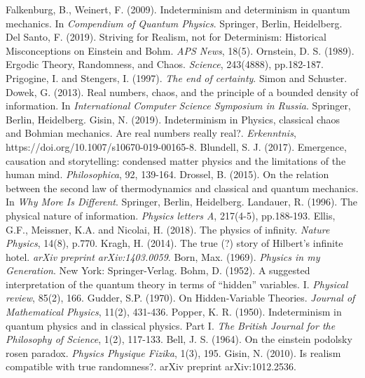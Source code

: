 \documentclass[12pt]{article}
\begin{document}
\begin{small}
\begin{thebibliography}{200}
 Falkenburg, B., Weinert, F. (2009). Indeterminism and determinism in quantum mechanics. In \emph{Compendium of Quantum Physics}. Springer, Berlin, Heidelberg.
 Del Santo, F. (2019). Striving for Realism, not for Determinism: Historical Misconceptions on Einstein and Bohm. \emph{APS News}, 18(5).
 Ornstein, D. S. (1989). Ergodic Theory, Randomness, and Chaos. \emph{Science}, 243(4888), pp.182-187.
 Prigogine, I. and Stengers, I. (1997). \emph{The end of certainty}. Simon and Schuster.
 Dowek, G. (2013). Real numbers, chaos, and the principle of a bounded density of information. In \emph{International Computer Science Symposium in Russia}. Springer, Berlin, Heidelberg.
 Gisin, N. (2019). Indeterminism in Physics, classical chaos and Bohmian mechanics. Are real numbers really real?. \emph{Erkenntnis}, https://doi.org/10.1007/s10670-019-00165-8.
 Blundell, S. J. (2017). Emergence, causation and storytelling: condensed matter physics and the limitations of the human mind. \emph{Philosophica}, 92, 139-164.
 Drossel, B. (2015). On the relation between the second law of thermodynamics and classical and quantum mechanics. In \emph{Why More Is Different}. Springer, Berlin, Heidelberg.
 Landauer, R. (1996). The physical nature of information. \emph{Physics letters A}, 217(4-5), pp.188-193.
Ellis, G.F., Meissner, K.A. and Nicolai, H. (2018). The physics of infinity. \emph{Nature Physics}, 14(8), p.770.
 Kragh, H. (2014). The true (?) story of Hilbert's infinite hotel. \emph{arXiv preprint arXiv:1403.0059}.
 Born, Max. (1969). \emph{Physics in my Generation}. New York: Springer-Verlag. 
 Bohm, D. (1952). A suggested interpretation of the quantum theory in terms of ``hidden'' variables. I. \emph{Physical review}, 85(2), 166.
 Gudder, S.P. (1970). On Hidden‐Variable Theories. \emph{Journal of Mathematical Physics}, 11(2), 431-436.
 Popper, K. R. (1950). Indeterminism in quantum physics and in classical physics. Part I. \emph{The British Journal for the Philosophy of Science}, 1(2), 117-133.
 Bell, J. S. (1964). On the einstein podolsky rosen paradox. \emph{Physics Physique Fizika}, 1(3), 195.
 Gisin, N. (2010). Is realism compatible with true randomness?. arXiv preprint arXiv:1012.2536. 

\end{thebibliography}
\end{small}
\end{document}
